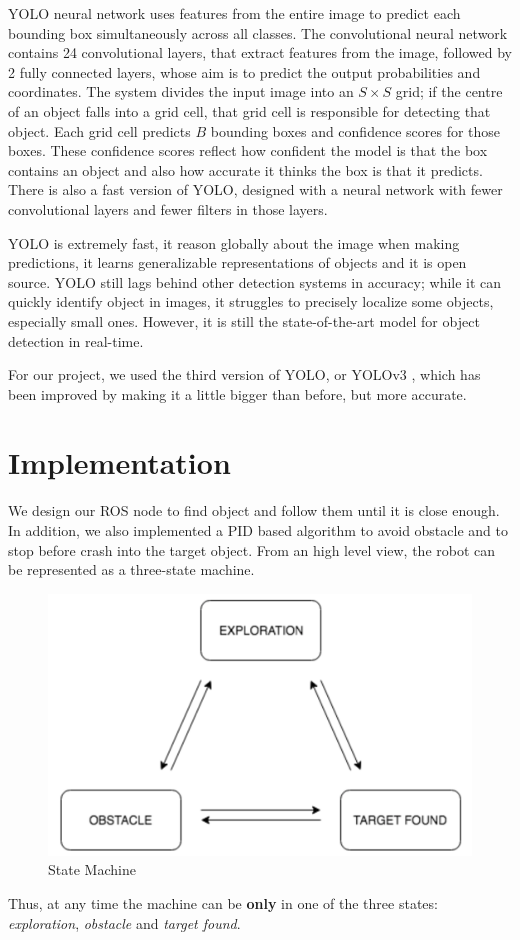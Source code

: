 \documentclass[letterpaper, 10 pt, conference]{ieeeconf}  %
\begin{document}
YOLO neural network uses features from the entire image to predict each bounding box simultaneously across all classes. The convolutional neural network contains 24 convolutional layers, that extract features from the image, followed by 2 fully connected layers, whose aim is to predict the output probabilities and coordinates. The system divides the input image into an $S \times S$ grid; if the centre of an object falls into a grid cell, that grid cell is responsible for detecting that object. Each grid cell predicts $B$ bounding boxes and confidence scores for those boxes. These confidence scores reflect how confident the model is that the box contains an object and also how accurate it thinks the box is that it predicts. There is also a fast version of YOLO, designed with a neural network with fewer convolutional layers and fewer filters in those layers.

YOLO is extremely fast, it reason globally about the image when making predictions, it learns generalizable representations of objects and it is open source. YOLO still lags behind other detection systems in accuracy; while it can quickly identify object in images, it struggles to precisely localize some objects, especially small ones. However, it is still the state-of-the-art model for object detection in real-time.

For our project, we used the third version of YOLO, or YOLOv3 \cite{Yolo3}, which has been improved by making it a little bigger than before, but more accurate.

\section{Implementation}
We design our ROS node to find object and follow them until it is close enough. In addition, we also implemented a PID based algorithm to avoid obstacle and to stop before crash into the target object. From an high level view, the robot can be represented as a three-state machine.
\begin{figure}[H]
\centering
\includegraphics[width=\linewidth]{images/state}
\caption{State Machine}
\end{figure}
Thus, at any time the machine can be \textbf{only} in one of the three states: \emph{exploration}, \emph{obstacle} and \emph{target found}. 
\end{document}
